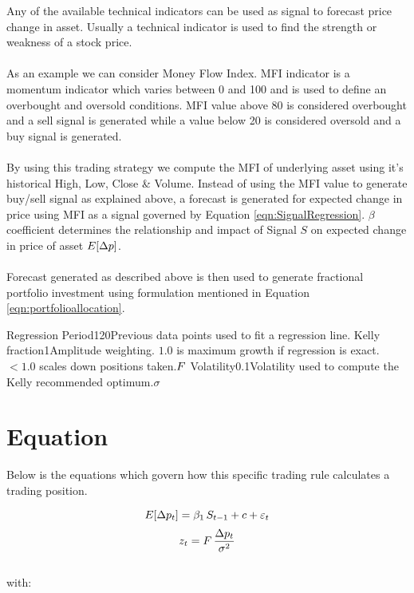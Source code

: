 \documentclass{article}
\begin{document}
\logo
{} %
\tblofcontents


\howtotrade
{Any of the available technical indicators can be used as signal to forecast price change in asset. Usually a technical indicator is used to find the strength or weakness of a stock price. \\ \\ As an example we can consider Money Flow Index. MFI indicator is a momentum indicator which varies between 0 and 100 and is used to define an overbought and oversold conditions. MFI value above 80 is considered overbought and a sell signal is generated while a value below 20 is considered oversold and a buy signal is generated. \\ \\
By using this trading strategy we compute the MFI of underlying asset using it's historical High, Low, Close \& Volume. Instead of using the MFI value to generate buy/sell signal as explained above, a forecast is generated for expected change in price using MFI as a signal governed by Equation \ref{eqn:SignalRegression}. $\beta$ coefficient determines the relationship and impact of Signal $S$ on expected change in price of asset $E[\Delta p]$.\\ \\
Forecast generated as described above is then used to generate fractional portfolio investment using formulation mentioned in Equation \ref{eqn:portfolioallocation}.
}

{Regression Period}{120}{Previous data points used to fit a regression line.}{\lookbacklength}
{Kelly fraction}{1}{Amplitude weighting. $1.0$ is maximum growth if regression is exact.
$<1.0$ scales down positions taken.}{$F$}
{Volatility}{0.1}{Volatility used to compute the Kelly recommended optimum.}{$\sigma$}
\stoptable %

\section{Equation}
Below is the equations which govern how this specific trading rule calculates a trading position.

\begin{equation}
\label{eqn:SignalRegression}
E[\Delta p_{t}] = \beta_{1} \, S_{t-1} + c + \varepsilon_{t}
\end{equation}
\begin{equation}
\label{eqn:portfolioallocation}
    z_{t} = F \, \frac{\Delta p_{t}}{\sigma^{2}}
\end{equation}
\\
with:
\end{document}
